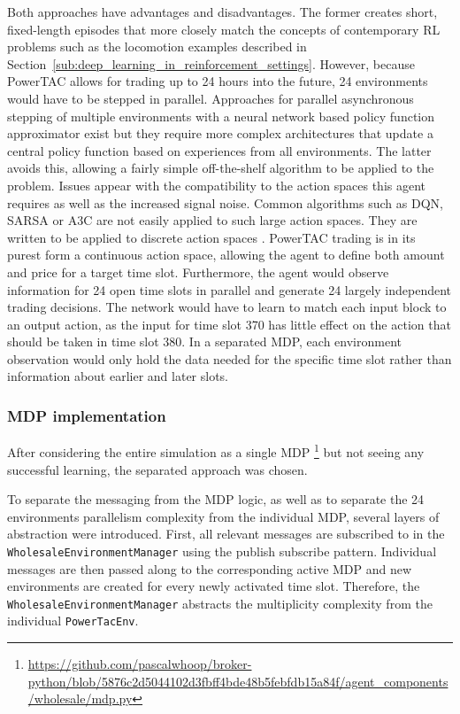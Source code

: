 Both approaches have advantages and disadvantages. The former creates short, fixed-length episodes that more closely
match the concepts of contemporary \ac{RL} problems such as the locomotion examples described in
Section~\ref{sub:deep_learning_in_reinforcement_settings}. However, because \ac{PowerTAC} allows for trading up to 24 hours into the future, 24
environments would have to be stepped in parallel. Approaches for parallel asynchronous stepping of multiple
environments with a neural network based policy function approximator exist \citep{mnih2016asynchronous,hafner2017agents}
but they require more complex architectures that update a central policy function based on experiences from all environments.
The latter avoids this, allowing a fairly simple off-the-shelf algorithm to be applied to the problem. Issues appear
with the compatibility to the action spaces this agent requires as well as the increased signal noise. Common algorithms
such as \ac{DQN}, \ac{SARSA} or \ac{A3C} are not easily applied to such large action spaces. They are written to be
applied to discrete action spaces \citep{baselines}. \ac{PowerTAC} trading is in its purest form a continuous action
space, allowing the agent to define both amount and price for a target time slot. Furthermore, the agent would observe
information for 24 open time slots in parallel and generate 24 largely independent trading decisions. The network would
have to learn to match each input block to an output action, as the input for time slot 370 has little effect on the
action that should be taken in time slot 380. In a separated \ac{MDP}, each environment observation would only hold the
data needed for the specific time slot rather than information about earlier and later slots.

\subsubsection{\acs{MDP} implementation}%
\label{sub:mdp_design_and_implementation}

After considering the entire simulation as a single \ac{MDP}
\footnote{\url{https://github.com/pascalwhoop/broker-python/blob/5876c2d5044102d3fbff4bde48b5febfdb15a84f/agent_components/wholesale/mdp.py}}
but not seeing any successful learning, the separated approach was chosen.

To separate the messaging from the \ac{MDP} logic, as well as to separate the 24 environments parallelism complexity
from the individual \ac{MDP}, several layers of abstraction were introduced. First, all relevant messages are
subscribed to in the \texttt{WholesaleEnvironmentManager} using the publish subscribe pattern. Individual messages are
then passed along to the corresponding active \ac{MDP} and new environments are created for every newly activated
time slot. Therefore, the \texttt{WholesaleEnvironmentManager} abstracts the multiplicity complexity from the individual
\texttt{PowerTacEnv}.

